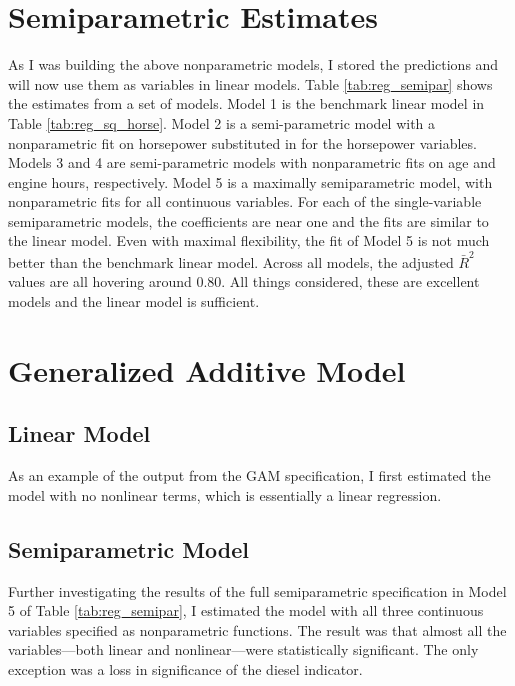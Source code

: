 \documentclass[11pt]{paper}
\begin{document}
 

\pagebreak
\section{Semiparametric Estimates}

As I was building the above nonparametric models, 
I stored the predictions and will now use them as variables in 
linear models. 
Table \ref{tab:reg_semipar} 
shows the estimates from a set of models. 
Model 1 is the benchmark linear model in 
Table \ref{tab:reg_sq_horse}. 
Model 2 is a semi-parametric model
with a nonparametric fit on horsepower
substituted in for the horsepower variables.
Models 3 and 4 are semi-parametric models
with nonparametric fits on age and engine hours, respectively.
Model 5 is a maximally semiparametric model, 
with nonparametric fits for all continuous variables. 
For each of the single-variable semiparametric models, 
the coefficients are near one
and the fits are similar to the linear model. 
Even with maximal flexibility, the fit of Model 5
is not much better than the benchmark linear model. 
Across all models, the adjusted $\bar{R}^2$ values are all hovering around 0.80. 
All things considered, these are excellent models
and the linear model is sufficient.







\pagebreak
\section{Generalized Additive Model}

\subsection{Linear Model}

As an example of the output from the GAM specification, 
I first estimated the model with no nonlinear terms, 
which is essentially a linear regression. 



\pagebreak
\subsection{Semiparametric Model}


Further investigating the results of the full semiparametric specification
in Model 5 of Table \ref{tab:reg_semipar},
I estimated the model with all three continuous variables specified as nonparametric functions. 
The result was that 
almost all the variables---both linear and nonlinear---were 
statistically significant. 
The only exception was a loss in significance of the diesel indicator. 
\end{document}
